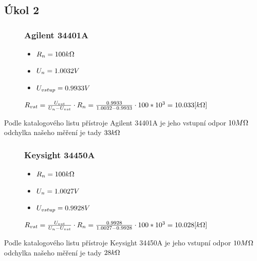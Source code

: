 \documentclass{article}
\begin{document}
\subsection*{Úkol 2}

\begin{figure}[H]
    \begin{minipage}[t]{0.3\textwidth}
        \subsubsection*{Agilent 34401A}
        \begin{itemize}
            \item \(R_n = 100\-k\Omega\) 
            \item \(U_n = 1.0032\-V\) 
            \item \(U_{vstup} = 0.9933\-V\) 
        \end{itemize}
    \end{minipage}
    \hfill
    \begin{minipage}[t]{0.7\textwidth}
        \vspace{10mm}
        \(
            R_{vst} = \frac{U_{vst}}{U_{n}-U_{vst}}\cdot R_n = \frac{0.9933}{1.0032-0.9933}\cdot 100*10^3 = 10.033\-[k\Omega]  
        \)
    \end{minipage}
\end{figure}
Podle katalogového listu přístroje Agilent 34401A je jeho vstupní odpor \(10\-M\Omega \)\\odchylka našeho měření je tady \(33\-k\Omega\)

\begin{figure}[H]
    \begin{minipage}[t]{0.3\textwidth}
        \subsubsection*{Keysight 34450A}
        \begin{itemize}
            \item \(R_n = 100\-k\Omega\) 
            \item \(U_n = 1.0027\-V\) 
            \item \(U_{vstup} = 0.9928\-V\) 
        \end{itemize}
    \end{minipage}
    \hfill
    \begin{minipage}[t]{0.7\textwidth}
        \vspace{10mm}
        \(
            R_{vst} = \frac{U_{vst}}{U_{n}-U_{vst}}\cdot R_n = \frac{0.9928}{1.0027-0.9928}\cdot 100*10^3 = 10.028\-[k\Omega]  
        \)
    \end{minipage}
\end{figure}
Podle katalogového listu přístroje Keysight 34450A je jeho vstupní odpor \(10\-M\Omega \)\\odchylka našeho měření je tady \(28\-k\Omega\)
\end{document}
